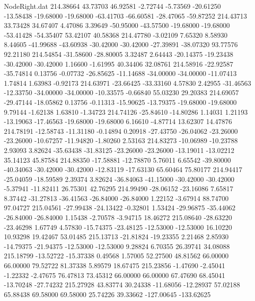 \begin{filecontents}{NodeRight.dat}
 214.38664   43.73703   46.92581    -2.72744   -5.73569  -20.61250  -13.58438  -19.68000  -19.68000  -63.41703  -66.60581  -28.47065  -59.87252
 214.43713   33.73428   34.67407     4.47086    3.39649  -50.95000  -43.57500  -19.68000  -19.68000  -53.41428  -54.35407   53.42107   40.58368
 214.47780   -3.02109    7.65320     8.58930    8.44605  -41.99688  -43.60938  -30.42000  -30.42000  -27.39891  -38.07320   93.77576   92.21180
 214.54854  -31.58600  -28.80005     3.32487    2.64443  -20.14375  -19.23438  -30.42000  -30.42000    1.16600   -1.61995   40.34406   32.08761
 214.58916  -22.92587  -35.74814     0.13756   -0.07732  -26.85625  -11.14688  -34.00000  -34.00000  -11.07413    1.74814    1.63983   -0.92173
 214.63971  -23.66425  -33.33160     4.57830    2.42955  -31.46563  -12.33750  -34.00000  -34.00000  -10.33575   -0.66840   55.03230   29.20383
 214.69057  -29.47144  -18.05862     0.13756   -0.11313  -15.90625  -13.79375  -19.68000  -19.68000    9.79144   -1.62138    1.63810   -1.34723
 214.74126  -25.84610  -14.80286     1.14031    1.21193  -13.19063  -17.46563  -19.68000  -19.68000    6.16610   -4.87714   13.62307   14.47876
 214.78191  -12.58743  -11.31180    -0.14894    0.20918  -27.43750  -26.04062  -23.26000  -23.26000  -10.67257  -11.94820   -1.80260    2.53163
 214.83273  -10.06989  -10.23788     2.93093    3.82624  -35.63438  -31.83125  -23.26000  -23.26000  -13.19011  -13.02212   35.14123   45.87584
 214.88350  -17.58881  -12.78870     5.76011    6.65542  -39.80000  -40.34063  -30.42000  -30.42000  -12.83119  -17.63130   65.60464   75.80177
 214.94417  -25.04059  -18.59589     2.39374    3.82624  -36.84063  -41.15000  -30.42000  -30.42000   -5.37941  -11.82411   26.75301   42.76295
 214.99490  -28.06152  -23.16086     7.65817    8.37442  -31.27813  -36.41563  -26.84000  -26.84000    1.22152   -3.67914   88.74700   97.04727
 215.04561  -27.99438  -24.13422    -0.32801    1.53424  -29.96875  -35.44062  -26.84000  -26.84000    1.15438   -2.70578   -3.94715   18.46272
 215.08640  -28.63220  -23.46298     1.67749    4.57830  -15.74375  -23.48125  -12.53000  -12.53000   16.10220   10.93298   19.42467   53.01485
 215.13713  -21.81824  -19.23355     2.21468    2.85930  -14.79375  -21.94375  -12.53000  -12.53000    9.28824    6.70355   26.39741   34.08088
 215.18799  -13.52722  -15.37338     0.49568    1.57005   52.27500   48.81562   66.00000   66.00000   79.52722   81.37338    5.89579   18.67475
 215.23856   -1.47690   -2.45041    -1.22332   -2.47675   76.47813   73.45312   66.00000   66.00000   67.47690   68.45041  -13.70248  -27.74232
 215.27928   43.83774   30.24338   -11.68056  -12.28937   57.02188   65.88438   69.58000   69.58000   25.74226   39.33662 -127.00645 -133.62625

\end{filecontents}
